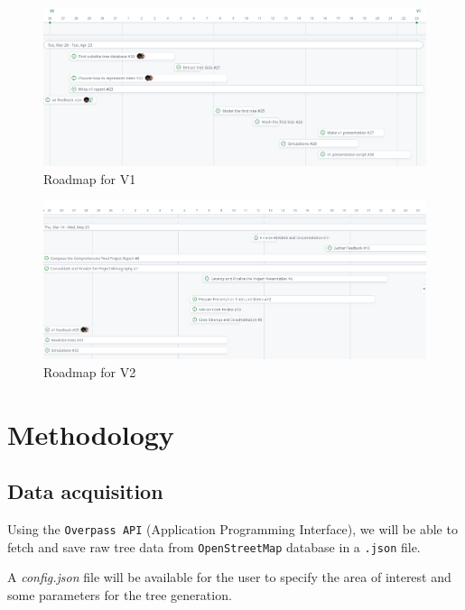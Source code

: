 \documentclass[12pt]{article}
\begin{document}
\begin{figure}[H]
    \centering
    \includegraphics[width=1\textwidth]{images/roadmap_v1.png}
    \caption{Roadmap for V1}
\end{figure}

\begin{figure}[H]
    \centering
    \includegraphics[width=1\textwidth]{images/roadmap_v2.png}
    \caption{Roadmap for V2}
\end{figure}

\newpage

\section{Methodology}

\subsection{Data acquisition}
Using the \texttt{Overpass API} (Application Programming Interface), we will be
able to fetch and save raw tree data from \texttt{OpenStreetMap} database
in a \texttt{.json} file.

A \textit{config.json} file will be available for the user to specify the area of
interest and some parameters for the tree generation. \\
\end{document}
